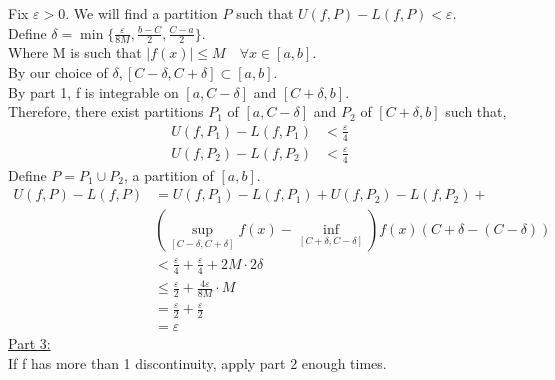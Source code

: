 \documentclass[12pt]{article}
\begin{document}
\begin{prf}{}
Fix \(\varepsilon > 0\). We will find a partition \(P\) such that \(U(f, P) - L(f, P) < \varepsilon\).\\
Define \(\delta = \min\{\frac{\varepsilon}{8M}, \frac{b - C}{2}, \frac{C - a}{2}\}\).\\
Where M is such that \(|f(x)| \le M \quad \forall x \in [a, b] \).\\
By our choice of \(\delta, [C-\delta, C+\delta] \subset [a, b]\).\\
By part 1, f is integrable on \([a, C-\delta]\) and \([C+\delta, b]\).\\
Therefore, there exist partitions \(P_1\) of \([a, C-\delta]\) and \(P_2\) of \([C+\delta, b]\) such that,
\begin{align*}
    U(f, P_1) - L(f, P_1) &< \frac{\varepsilon}{4}\\
    U(f, P_2) - L(f, P_2) &< \frac{\varepsilon}{4}
\end{align*}
Define \(P = P_1 \cup P_2\), a partition of \([a, b]\).\\
\begin{align*}
    U(f, P) - L(f, P) &= U(f, P_1) - L(f, P_1) + U(f, P_2) - L(f, P_2) +\\ &\left(\displaystyle\sup_{[C-\delta, C+\delta]}f(x) - \displaystyle\inf_{[C+\delta, C-\delta]}\right)f(x)(C+\delta - (C-\delta))\\
    &< \frac{\varepsilon}{4} + \frac{\varepsilon}{4} + 2M\cdot 2\delta\\
    &\le \frac{\varepsilon}{2} + \frac{4\varepsilon}{8M}\cdot M\\
    &= \frac{\varepsilon}{2} + \frac{\varepsilon}{2}\\
    &= \varepsilon
\end{align*}
\underline{Part 3:}\\
If f has more than 1 discontinuity, apply part 2 enough times.
\end{prf}
\end{document}
